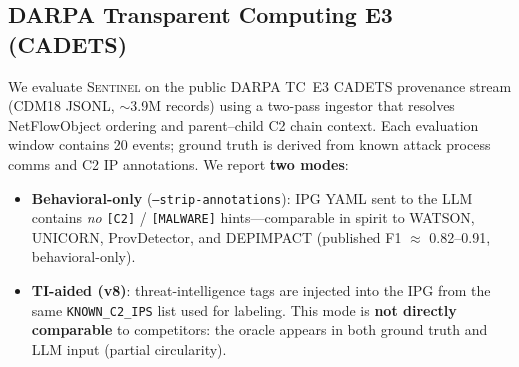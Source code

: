 \documentclass[journal]{IEEEtran}
\newcommand{\sentinel}{\textsc{Sentinel}}
\begin{document}

\subsection{DARPA Transparent Computing E3 (CADETS)}\label{sec:eval_darpa}

We evaluate \sentinel{} on the public DARPA TC~E3 CADETS provenance stream
(CDM18 JSONL, $\sim$3.9M records) using a two-pass ingestor that resolves
NetFlowObject ordering and parent--child C2 chain context.
Each evaluation window contains 20 events; ground truth is derived from
known attack process comms and C2 IP annotations.
We report \textbf{two modes}:

\begin{itemize}
  \item \textbf{Behavioral-only} (\texttt{--strip-annotations}): IPG YAML
        sent to the LLM contains \emph{no} \texttt{[C2]} / \texttt{[MALWARE]}
        hints---comparable in spirit to WATSON, UNICORN, ProvDetector, and
        DEPIMPACT (published F1 $\approx$ 0.82--0.91, behavioral-only).
  \item \textbf{TI-aided (v8)}: threat-intelligence tags are injected into
        the IPG from the same \texttt{KNOWN\_C2\_IPS} list used for labeling.
        This mode is \textbf{not directly comparable} to competitors: the oracle
        appears in both ground truth and LLM input (partial circularity).
\end{itemize}
\end{document}
